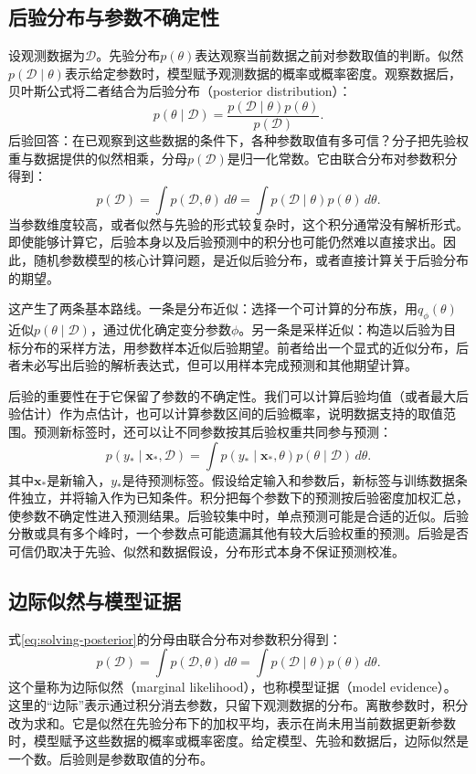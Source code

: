 \subsection{后验分布与参数不确定性}
设观测数据为$\mathcal D$。先验分布$p(\theta)$表达观察当前数据之前对参数取值的判断。似然$p(\mathcal D\mid\theta)$表示给定参数时，模型赋予观测数据的概率或概率密度。观察数据后，贝叶斯公式将二者结合为后验分布（posterior distribution）：
\begin{equation}
 p(\theta\mid\mathcal D)=\frac{p(\mathcal D\mid\theta)p(\theta)}{p(\mathcal D)}.
 \label{eq:solving-posterior}
\end{equation}
后验回答：在已观察到这些数据的条件下，各种参数取值有多可信？分子把先验权重与数据提供的似然相乘，分母$p(\mathcal D)$是归一化常数。它由联合分布对参数积分得到：
\begin{equation}
 p(\mathcal D)=\int p(\mathcal D,\theta)\,d\theta
 =\int p(\mathcal D\mid\theta)p(\theta)\,d\theta.
 \label{eq:solving-posterior-normalizer}
\end{equation}
当参数维度较高，或者似然与先验的形式较复杂时，这个积分通常没有解析形式。即使能够计算它，后验本身以及后验预测中的积分也可能仍然难以直接求出。因此，随机参数模型的核心计算问题，是近似后验分布，或者直接计算关于后验分布的期望。

这产生了两条基本路线。一条是分布近似：选择一个可计算的分布族，用$q_\phi(\theta)$近似$p(\theta\mid\mathcal D)$，通过优化确定变分参数$\phi$。另一条是采样近似：构造以后验为目标分布的采样方法，用参数样本近似后验期望。前者给出一个显式的近似分布，后者未必写出后验的解析表达式，但可以用样本完成预测和其他期望计算。

后验的重要性在于它保留了参数的不确定性。我们可以计算后验均值（或者最大后验估计）作为点估计，也可以计算参数区间的后验概率，说明数据支持的取值范围。预测新标签时，还可以让不同参数按其后验权重共同参与预测：
\begin{equation}
 p(y_*\mid\bm x_*,\mathcal D)=\int p(y_*\mid\bm x_*,\theta)p(\theta\mid\mathcal D)\,d\theta.
 \label{eq:solving-posterior-predictive}
\end{equation}
其中$\bm x_*$是新输入，$y_*$是待预测标签。假设给定输入和参数后，新标签与训练数据条件独立，并将输入作为已知条件。积分把每个参数下的预测按后验密度加权汇总，使参数不确定性进入预测结果。后验较集中时，单点预测可能是合适的近似。后验分散或具有多个峰时，一个参数点可能遗漏其他有较大后验权重的预测。后验是否可信仍取决于先验、似然和数据假设，分布形式本身不保证预测校准。

\subsection{边际似然与模型证据}
式\eqref{eq:solving-posterior}的分母由联合分布对参数积分得到：
\begin{equation}
 p(\mathcal D)=\int p(\mathcal D,\theta)\,d\theta
 =\int p(\mathcal D\mid\theta)p(\theta)\,d\theta.
 \label{eq:solving-model-evidence}
\end{equation}
这个量称为边际似然（marginal likelihood），也称模型证据（model evidence）。这里的“边际”表示通过积分消去参数，只留下观测数据的分布。离散参数时，积分改为求和。它是似然在先验分布下的加权平均，表示在尚未用当前数据更新参数时，模型赋予这些数据的概率或概率密度。给定模型、先验和数据后，边际似然是一个数。后验则是参数取值的分布。

